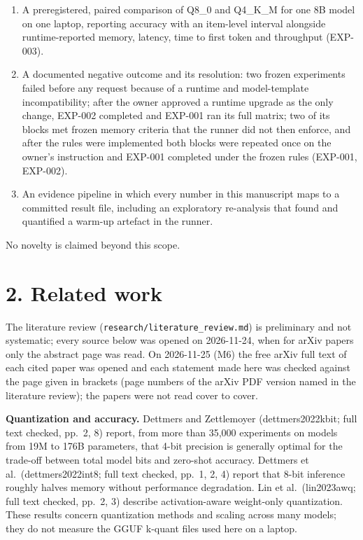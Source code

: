 \documentclass[
]{article}
\providecommand{\tightlist}{%
  \setlength{\itemsep}{0pt}\setlength{\parskip}{0pt}}
\begin{document}
\begin{enumerate}
\def\labelenumi{\arabic{enumi}.}
\tightlist
\item
  A preregistered, paired comparison of Q8\_0 and Q4\_K\_M for one 8B
  model on one laptop, reporting accuracy with an item-level interval
  alongside runtime-reported memory, latency, time to first token and
  throughput (EXP-003).
\item
  A documented negative outcome and its resolution: two frozen
  experiments failed before any request because of a runtime and
  model-template incompatibility; after the owner approved a runtime
  upgrade as the only change, EXP-002 completed and EXP-001 ran its full
  matrix; two of its blocks met frozen memory criteria that the runner
  did not then enforce, and after the rules were implemented both blocks
  were repeated once on the owner's instruction and EXP-001 completed
  under the frozen rules (EXP-001, EXP-002).
\item
  An evidence pipeline in which every number in this manuscript maps to
  a committed result file, including an exploratory re-analysis that
  found and quantified a warm-up artefact in the runner.
\end{enumerate}

No novelty is claimed beyond this scope.

\section{2. Related work}\label{related-work}

The literature review (\texttt{research/literature\_review.md}) is
preliminary and not systematic; every source below was opened on
2026-11-24, when for arXiv papers only the abstract page was read. On
2026-11-25 (M6) the free arXiv full text of each cited paper was opened
and each statement made here was checked against the page given in
brackets (page numbers of the arXiv PDF version named in the literature
review); the papers were not read cover to cover.

\textbf{Quantization and accuracy.} Dettmers and Zettlemoyer
(dettmers2022kbit; full text checked, pp.~2, 8) report, from more than
35,000 experiments on models from 19M to 176B parameters, that 4-bit
precision is generally optimal for the trade-off between total model
bits and zero-shot accuracy. Dettmers et al.~(dettmers2022int8; full
text checked, pp.~1, 2, 4) report that 8-bit inference roughly halves
memory without performance degradation. Lin et al.~(lin2023awq; full
text checked, pp.~2, 3) describe activation-aware weight-only
quantization. These results concern quantization methods and scaling
across many models; they do not measure the GGUF k-quant files used here
on a laptop.
\end{document}

